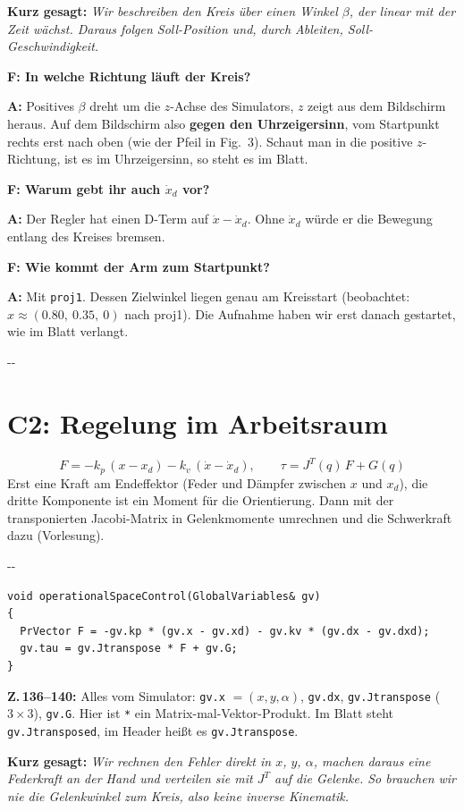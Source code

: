 \documentclass[10pt,a4paper]{article}
\makeatletter
\newcommand{\secneed}[1]{\par\penalty\@M\begingroup\setlength{\dimen@}{#1}\dimen@ii\pagegoal
  \advance\dimen@ii-\pagetotal\ifdim\dimen@>\dimen@ii\ifdim\dimen@ii>\z@\vfil\fi\penalty-\@M\fi\endgroup}
\let\oldsection\section
\renewcommand{\section}{\secneed{9\baselineskip}\oldsection}
\newcommand{\frage}[2]{\textbf{F: #1}\par\nopagebreak\vspace{1pt}\textbf{A:} #2\par\vspace{5pt}}
\newcommand{\sagen}[1]{\textbf{Kurz gesagt:} \emph{#1}\par}
\newcommand{\code}[1]{\texttt{#1}}
\makeatother
\begin{document}
\sagen{Wir beschreiben den Kreis über einen Winkel $\beta$, der linear mit der Zeit wächst. Daraus folgen Soll-Position und,
durch Ableiten, Soll-Geschwindigkeit.}

\begin{fragen}
\frage{In welche Richtung läuft der Kreis?}
{Positives $\beta$ dreht um die $z$-Achse des Simulators, $z$ zeigt aus dem Bildschirm heraus. Auf dem Bildschirm also
\textbf{gegen den Uhrzeigersinn}, vom Startpunkt rechts erst nach oben (wie der Pfeil in Fig.~3). Schaut man in die positive
$z$-Richtung, ist es im Uhrzeigersinn, so steht es im Blatt.}
\frage{Warum gebt ihr auch $\dot x_d$ vor?}
{Der Regler hat einen D-Term auf $\dot x - \dot x_d$. Ohne $\dot x_d$ würde er die Bewegung entlang des Kreises bremsen.}
\frage{Wie kommt der Arm zum Startpunkt?}
{Mit \code{proj1}. Dessen Zielwinkel liegen genau am Kreisstart (beobachtet: $x \approx (0.80,\ 0.35,\ 0)$ nach proj1). Die
Aufnahme haben wir erst danach gestartet, wie im Blatt verlangt.}
\end{fragen}

\section{C2: Regelung im Arbeitsraum}

\[
  F = -k_p\,(x - x_d) - k_v\,(\dot x - \dot x_d), \qquad \tau = J^T(q)\,F + G(q)
\]
Erst eine Kraft am Endeffektor (Feder und Dämpfer zwischen $x$ und $x_d$), die dritte Komponente ist ein Moment für die
Orientierung. Dann mit der transponierten Jacobi-Matrix in Gelenkmomente umrechnen und die Schwerkraft dazu (Vorlesung).

\secneed{6\baselineskip}
\begin{lstlisting}[firstnumber=136]
void operationalSpaceControl(GlobalVariables& gv)
{
  PrVector F = -gv.kp * (gv.x - gv.xd) - gv.kv * (gv.dx - gv.dxd);
  gv.tau = gv.Jtranspose * F + gv.G;
}
\end{lstlisting}
\textbf{Z.\,136--140:} Alles vom Simulator: \code{gv.x} $= (x, y, \alpha)$, \code{gv.dx}, \code{gv.Jtranspose}
($3 \times 3$), \code{gv.G}. Hier ist \code{*} ein Matrix-mal-Vektor-Produkt. Im Blatt steht \code{gv.Jtransposed}, im
Header heißt es \code{gv.Jtranspose}.

\sagen{Wir rechnen den Fehler direkt in $x$, $y$, $\alpha$, machen daraus eine Federkraft an der Hand und verteilen sie mit
$J^T$ auf die Gelenke. So brauchen wir nie die Gelenkwinkel zum Kreis, also keine inverse Kinematik.}
\end{document}
